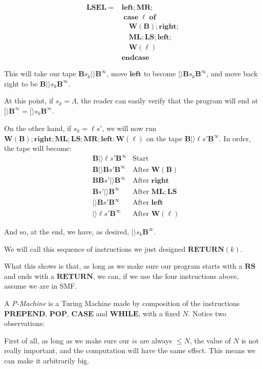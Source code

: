 \documentclass{article}
\newcommand{\B}{\mathbf{B}}
\DeclareMathOperator{\Ncase}{\mathbf{case}}
\DeclareMathOperator{\Nof}{\mathbf{of}}
\DeclareMathOperator{\Nendcase}{\mathbf{endcase}}
\newcommand{\MR}{\mathbf{MR}}
\newcommand{\ML}{\mathbf{ML}}
\newcommand{\W}{\mathbf{W}}
\newcommand{\RS}{\mathbf{RS}}
\newcommand{\LS}{\mathbf{LS}}
\newcommand{\LSEL}{\mathbf{LSEL}}
\newcommand{\Oright}{\mathbf{right}}
\newcommand{\Oleft}{\mathbf{left}}
\newcommand{\PREPEND}{\mathbf{PREPEND}}
\newcommand{\POP}{\mathbf{POP}}
\newcommand{\CASE}{\mathbf{CASE}}
\newcommand{\WHILE}{\mathbf{WHILE}}
\newcommand{\RETURN}{\mathbf{RETURN}}
\begin{document}
	\begin{align*}
	\LSEL =& \Oleft; \MR;\\
	&\Ncase \ell \Nof\\
	&\quad \W(\B); \Oright;\\
	&\quad \ML; \LS; \Oleft;\\
	&\quad \W(\ell)\\
	&\Nendcase
	\end{align*}
	
	This will take our tape $\B s_k |\rangle \B^\infty$, move $\Oleft$ to become $|\rangle \B s_k \B^\infty$, and move back right to be $\B |\rangle s_k \B^\infty$.
	
	At this point, if $s_k = \Lambda$, the reader can easily verify that the program will end at $|\rangle \B^\infty = |\rangle s_k \B^\infty$.
	
	On the other hand, if $s_k = \ell s'$, we will now run $\W(\B); \Oright; \ML; \LS; \MR; \Oleft; \W(\ell)$ on the tape $\B |\rangle \ell s' \B^\infty$. In order, the tape will become:
	\begin{align*}
	&\B |\rangle \ell s' \B^\infty &\text{Start}\\
	&\B |\rangle \B s' \B^\infty &\text{After $\W(\B)$}\\
	&\B \B s' |\rangle \B^\infty &\text{After $\Oright$}\\
	&\B s' |\rangle \B^\infty &\text{After $\ML; \LS$}\\
	&|\rangle \B s' \B^\infty &\text{After $\Oleft$}\\
	&|\rangle \ell s' \B^\infty &\text{After $\W(\ell)$}
	\end{align*}
	
	And so, at the end, we have, as desired, $|\rangle s_k \B^\infty$.
	
	We will call this sequence of instructions we just designed $\RETURN(k)$.
	
	What this shows is that, as long as we make sure our program starts with a $\RS$ and ends with a $\RETURN$, we can, if we use the four instructions above, assume we are in SMF.
	
	A \emph{P-Machine} is a Turing Machine made by composition of the instructions $\PREPEND$, $\POP$, $\CASE$ and $\WHILE$, with a fixed $N$. Notice two observations:
	
	First of all, as long as we make sure our $i$s are always $\leq N$, the value of $N$ is not really important, and the computation will have the same effect. This means we can make it arbitrarily big.
	
\end{document}
